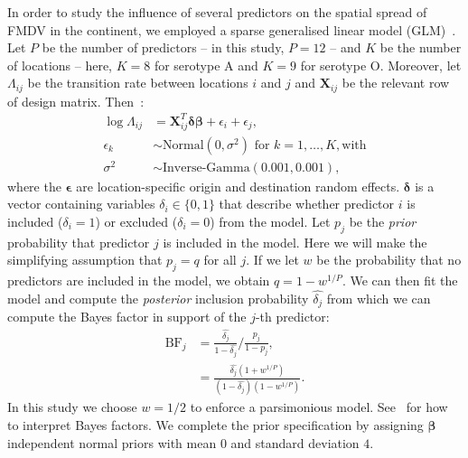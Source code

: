 \documentclass[a4paper,10pt]{article}
\begin{document}
In order to study the influence of several predictors on the spatial spread of FMDV in the continent, we employed a sparse generalised linear model (GLM)~\cite{M-Lemey2014,M-Dudas2017}.
Let $P$ be the number of predictors -- in this study, $P = 12$ -- and $K$ be the number of locations -- here, $K = 8$ for serotype A and $K = 9$ for serotype O.
Moreover, let $\Lambda_{ij}$ be the transition rate between locations $i$ and $j$ and $\boldsymbol X_{ij}$ be the relevant row of design matrix.
Then~\citep{M-Dudas2017}:
\begin{align*}
 \log \Lambda_{ij}  &= \boldsymbol X_{ij}^T \boldsymbol\delta \boldsymbol{\beta}
+ \epsilon_i + \epsilon_j, \\
\epsilon_k &\sim \text{Normal}(0, \sigma^2) \text{ for } k = 1, \ldots, K, \text{with} \\
\sigma^2 &\sim \text{Inverse-Gamma}(0.001, 0.001),
\end{align*}
where the $\boldsymbol\epsilon$ are location-specific origin and destination random effects.
$\boldsymbol\delta$ is a vector containing variables $\delta_i \in \{0, 1\}$ that describe whether predictor $i$ is included ($\delta_i = 1$) or excluded ($\delta_i = 0$) from the model.
Let $p_j$ be the \textit{prior} probability that predictor $j$ is included in the model.
Here we will make the simplifying assumption that $p_j = q$ for all $j$.
If we let $w$ be the probability that no predictors are included in the model, we obtain  $q = 1 - w^{1/P}$.
We can then fit the model and compute the \textit{posterior} inclusion probability $\hat{\delta_j}$ from which we can compute the Bayes factor in support of the $j$-th predictor:
\begin{align*}
 \text{BF}_j &= \frac{\hat{\delta_j} }{1-\hat{\delta_j} }/\frac{p_j}{1-p_j}, \\
  &= \frac{\hat{\delta_j} (1 + w^{1/P})}{(1-\hat{\delta_j})(1 - w^{1/P}) }.
\end{align*}
In this study we choose $w = 1/2$ to enforce a parsimonious model.
See~\cite{M-KassRaftery1995} for how to interpret Bayes factors.
We complete the prior specification by assigning $\boldsymbol\beta$ independent normal priors with mean $0$ and standard deviation $4$.


\end{document}
